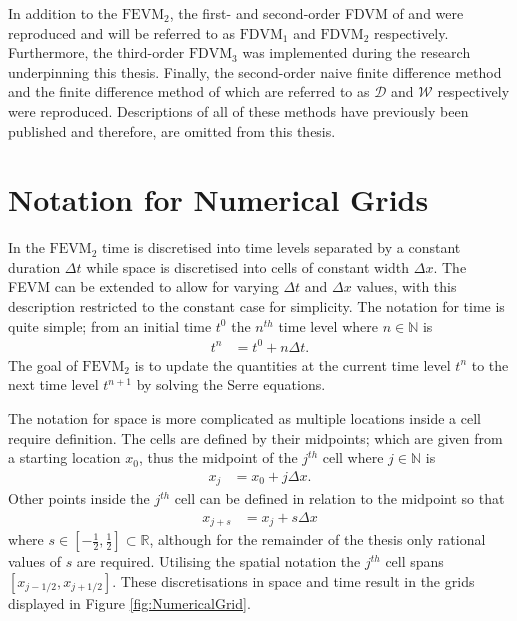  
In addition to the $\text{FEVM}_2$, the first- and second-order FDVM of \citet{Hank-etal-2010-2034} and \citet{Zoppou-etal-2017} were reproduced and will be referred to as $\text{FDVM}_1$ and $\text{FDVM}_2$ respectively. Furthermore, the third-order $\text{FDVM}_3$ was implemented during the research underpinning this thesis. Finally, the second-order naive finite difference method \cite{Pitt-J-2014} and the finite difference method of \citet{El-etal-2006} which are referred to as $\mathcal{D}$ and $\mathcal{W}$ respectively were reproduced. Descriptions of all of these methods have previously been published \cite{Zoppou-etal-2017,Pitt-2018-61} and therefore, are omitted from this thesis.


\section{Notation for Numerical Grids}

In the $\text{FEVM}_2$ time is discretised into time levels separated by a constant duration $\Delta t$ while space is discretised into cells of constant width $\Delta x$. The FEVM can be extended to allow for varying $\Delta t$ and $\Delta x$ values, with this description restricted to the constant case for simplicity. The notation for time is quite simple; from an initial time $t^0$ the $n^{th}$ time level where $n \in \mathbb{N}$ is
\begin{align*}
t^n &= t^0 + n \Delta t.
\end{align*}
The goal of $\text{FEVM}_2$ is to update the quantities at the current time level $t^n$ to the next time level $t^{n+1}$ by solving the Serre equations. 

The notation for space is more complicated as multiple locations inside a cell require definition. The cells are defined by their midpoints; which are given from a starting location $x_0$, thus the midpoint of the $j^{th}$ cell where $j \in \mathbb{N}$ is
\begin{align*}
x_j &= x_0 + j \Delta x.
\end{align*}
Other points inside the $j^{th}$ cell can be defined in relation to the midpoint so that 
\begin{align*}
x_{j + s} &= x_j + s \Delta x
\end{align*}
where $s \in \left[-\frac{1}{2} , \frac{1}{2}\right] \subset\mathbb{R}$, although for the remainder of the thesis only rational values of $s$ are required. Utilising the spatial notation the $j^{th}$ cell spans $\left[x_{j -1/2},x_{j + 1/2}\right]$. These discretisations in space and time result in the grids displayed in Figure \ref{fig:NumericalGrid}.

